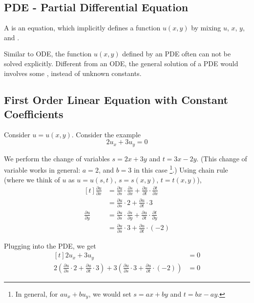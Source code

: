 \documentclass[11pt,fleqn]{book} %
\begin{document}
\subsection*{PDE - Partial Differential Equation}

A  is an equation, which implicitly defines a function $u(x, y)$ by mixing $u$, $x$, $y$, and .

Similar to ODE, the function $u(x, y)$ defined by an PDE often can not be solved explicitly. Different from an ODE, the general solution of a PDE would involves some , instead of unknown constants.

\subsection*{First Order Linear Equation with Constant Coefficients}

Consider $u = u(x, y)$. Consider the example $$2u_x + 3u_y = 0$$

We perform the change of variables $s = 2x + 3y$ and $t = 3x - 2y$. (This change of variable works in general: $a = 2$, and $b = 3$ in this case \footnote{In general, for $au_x + bu_y$, we would set $s = ax + by$ and $t = bx - ay$. }.) Using chain rule (where we think of $u$ as $u = u(s,t)$, $s = s(x,y)$, $t = t(x,y)$), 
$$\begin{aligned}[t]
    \frac{\partial u}{\partial x}
     & = \frac{\partial u}{\partial s} \cdot \frac{\partial s}{\partial x} + \frac{\partial u}{\partial t} \cdot \frac{\partial t}{\partial x} \\
     & = \frac{\partial u}{\partial s} \cdot 2 + \frac{\partial u}{\partial t} \cdot 3 \\
    \frac{\partial u}{\partial y}
     & =  \frac{\partial u}{\partial s} \cdot \frac{\partial s}{\partial y} + \frac{\partial u}{\partial t} \cdot \frac{\partial t}{\partial y} \\
     & = \frac{\partial u}{\partial s} \cdot 3 + \frac{\partial u}{\partial t} \cdot (-2)
\end{aligned}$$

Plugging into the PDE, we get 
$$\begin{aligned}[t]
    2u_x + 3u_y & = 0 \\
    2 \left( \frac{\partial u}{\partial s} \cdot 2 + \frac{\partial u}{\partial t} \cdot 3 \right) + 3 \left( \frac{\partial u}{\partial s} \cdot 3 + \frac{\partial u}{\partial t} \cdot (-2) \right) & = 0
\end{aligned}$$
\end{document}
